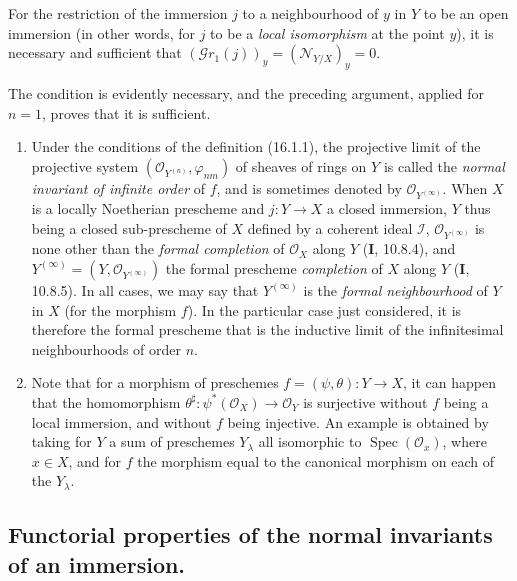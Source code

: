 \begin{corollary}[16.1.10]
\label{IV.16.1.10}
For the restriction of the immersion $j$ to a neighbourhood of $y$ in $Y$ to be
an open immersion \textup{(in other words, for $j$ to be a \emph{local isomorphism} at the
point $y$)}, it is necessary and sufficient that
$(\mathscr{G}r_1(j))_y=(\mathscr{N}_{Y/X})_y=0$.
\end{corollary}

The condition is evidently necessary, and the preceding argument, applied
for $n=1$, proves that it is sufficient.

\begin{remarks}[16.1.11]\label{IV.16.1.11}
\begin{enumerate}
\item[(i)] Under the conditions of the definition (16.1.1), the projective limit
of the projective system
$(\mathcal{O}_{Y^{(n)}},\varphi_{nm})$ of sheaves of rings on $Y$ is
called the \emph{normal invariant of infinite order} of $f$, and is sometimes denoted by
$\mathcal{O}_{Y^{(\infty)}}$. When $X$ is a locally
Noetherian prescheme and $j:Y\to X$ a closed immersion, $Y$ thus being a closed
sub-prescheme of $X$ defined by a coherent ideal $\mathscr{I}$,
$\mathcal{O}_{Y^{(\infty)}}$ is none other than the \emph{formal completion} of
$\mathcal{O}_X$ along $Y$ (\textbf{I}, 10.8.4), and
$Y^{(\infty)}=(Y,\mathcal{O}_{Y^{(\infty)}})$ the formal prescheme \emph{completion} of
$X$ along $Y$ (\textbf{I}, 10.8.5). In all cases, we may say that
$Y^{(\infty)}$ is the \emph{formal neighbourhood} of $Y$ in $X$ (for the morphism
$f$). In the particular case just considered, it is therefore the formal
prescheme that is the inductive limit of the infinitesimal neighbourhoods of order $n$.
\item[(ii)] Note that for a morphism of preschemes
$f=(\psi,\theta):Y\to X$, it can happen that the homomorphism
$\theta^\sharp:\psi^*(\mathcal{O}_X)\to\mathcal{O}_Y$ is surjective without $f$
being a local
immersion, and without $f$ being injective. An example is obtained by taking for $Y$
a sum of preschemes $Y_\lambda$ all isomorphic to
$\operatorname{Spec}(\mathcal{O}_x)$, where $x\in X$, and for $f$ the morphism
equal to the canonical morphism on each of the $Y_\lambda$.
\end{enumerate}
\end{remarks}

\subsection{Functorial properties of the normal invariants of an immersion.}

